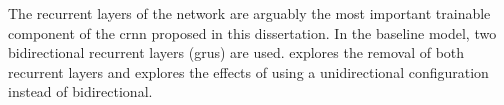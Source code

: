 
The recurrent layers of the network are arguably the most
important trainable component of the \gls{crnn} proposed in
this dissertation. In the baseline model, two bidirectional
recurrent layers (\glspl{gru}) are used.
 explores the
removal of both recurrent layers and
 explores the
effects of using a unidirectional configuration instead of
bidirectional. 

